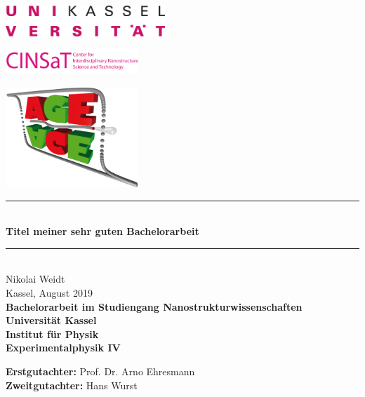 \begin{titlepage}
  \begin{center}
    \begin{minipage}[T]{0.4\textwidth}
      \begin{flushleft}
        \includegraphics[width=6cm]{img/Uni}
      \end{flushleft}
    \end{minipage}
    \begin{minipage}[T]{0.25\textwidth}
      \centering
      \includegraphics[width=5cm]{img/CINSaT}
    \end{minipage}
    \begin{minipage}[T]{0.25\textwidth}
      \begin{flushright}
        \includegraphics[width=5cm]{img/AGE}
      \end{flushright}
    \end{minipage}
  \end{center}


  \begin{center}
    \rule{\columnwidth}{1 pt}\\
    \vspace{0.5cm}
    {\LARGE
      \textbf{Titel meiner sehr guten Bachelorarbeit} \\ 
    }
    \rule{\columnwidth}{1 pt}\\
    \vspace{2cm}
    {\Large
      Nikolai Weidt\\
      Kassel, August 2019\\
      \vspace{1.5cm}
    }
    {\bfseries
    Bachelorarbeit im Studiengang Nanostrukturwissenschaften\\ 
    Universität Kassel\\
    Institut für Physik\\
    Experimentalphysik IV\\
    }
    \end{center}
      \vfill
      {\begin{tabbing}
      \textbf{Erstgutachter:} Prof. Dr. Arno Ehresmann \\
      \textbf{Zweitgutachter:} Hans Wurst\\
      \end{tabbing}
      }

\end{titlepage}
\restoregeometry